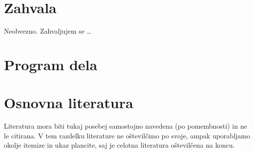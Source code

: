\documentclass[12pt,a4paper,twoside]{article}
\theoremstyle{definition} %
\theoremstyle{plain} %
\numberwithin{equation}{section}  %
\renewcommand{\listfigurename}{Kazalo slik}%
\begin{document}
%
%
%
%
%

\section*{Zahvala}
Neobvezno.
Zahvaljujem se \dots

\cleardoublepage

\tableofcontents


\cleardoublepage

\section*{Program dela}


\section*{Osnovna literatura}
Literatura mora biti tukaj posebej samostojno navedena (po pomembnosti) in ne
le citirana. V tem razdelku literature ne oštevilčimo po svoje, ampak uporabljamo
okolje itemize in ukaz plancite, saj je celotna literatura oštevilčena na koncu.
\end{document}
